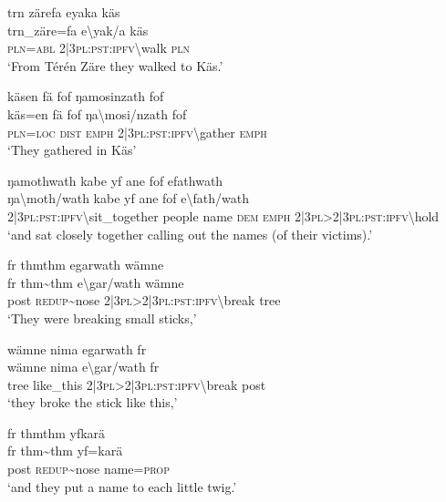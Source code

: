\ea\label{ex:5:a1470}
trn zärefa eyaka käs\\
\gll trn\_zäre=fa	e{\textbackslash}yak/a	käs\\
     \textsc{pln}=\textsc{abl}	2|3\textsc{pl}:\textsc{pst}:\textsc{ipfv}{\textbackslash}walk	\textsc{pln}\\
\glt `From Térén Zäre they walked to Käs.'
\z

\ea\label{ex:5:a1471}
käsen fä fof ŋamosinzath fof\\
\gll käs=en	fä	fof	ŋa{\textbackslash}mosi/nzath	fof\\
     \textsc{pln}=\textsc{loc}	\textsc{dist}	\textsc{emph}	2|3\textsc{pl}:\textsc{pst}:\textsc{ipfv}{\textbackslash}gather	\textsc{emph}\\
\glt `They gathered in Käs'
\z

\ea\label{ex:5:a1472}
ŋamothwath kabe yf ane fof efathwath\\
\gll ŋa{\textbackslash}moth/wath	kabe	yf	ane	fof	e{\textbackslash}fath/wath\\
     2|3\textsc{pl}:\textsc{pst}:\textsc{ipfv}{\textbackslash}sit\_together	people	name	\textsc{dem}	\textsc{emph}	2|3\textsc{pl}>2|3\textsc{pl}:\textsc{pst}:\textsc{ipfv}{\textbackslash}hold\\
\glt `and sat closely together calling out the names (of their victims).'
\z

\ea\label{ex:5:a1473}
fr thmthm egarwath wämne\\
\gll fr	thm{\textasciitilde}thm	e{\textbackslash}gar/wath	wämne\\
     post	\textsc{redup}{\textasciitilde}nose	2|3\textsc{pl}>2|3\textsc{pl}:\textsc{pst}:\textsc{ipfv}{\textbackslash}break	tree\\
\glt `They were breaking small sticks,'
\z

\ea\label{ex:5:a1474}
wämne nima egarwath fr\\
\gll wämne	nima	e{\textbackslash}gar/wath	fr\\
     tree	like\_this	2|3\textsc{pl}>2|3\textsc{pl}:\textsc{pst}:\textsc{ipfv}{\textbackslash}break	post\\
\glt `they broke the stick like this,'
\z

\ea\label{ex:5:a1475}
fr thmthm yfkarä\\
\gll fr	thm{\textasciitilde}thm	yf=karä\\
     post	\textsc{redup}{\textasciitilde}nose	name=\textsc{prop}\\
\glt `and they put a name to each little twig.'
\z

